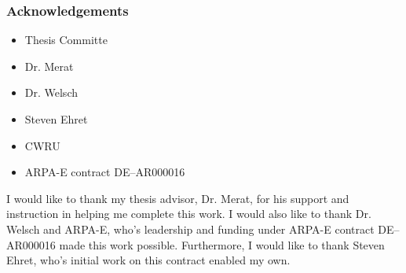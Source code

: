 \ifisPPT
\begin{frame}
  \frametitle{Acknowledgements}
    \begin{itemize}
        \item Thesis Committe
        \item Dr. Merat
        \item Dr. Welsch
        \item Steven Ehret
        \item CWRU
        \item ARPA-E contract DE--AR000016
    \end{itemize}
\end{frame}
\else
I would like to thank my thesis advisor, Dr. Merat, for his support and instruction in helping me complete this work. I would also like to thank Dr. Welsch and ARPA-E, who's leadership and funding under ARPA-E contract DE--AR000016 made this work possible. Furthermore, I would like to thank Steven Ehret, who's initial work on this contract enabled my own.
\fi


